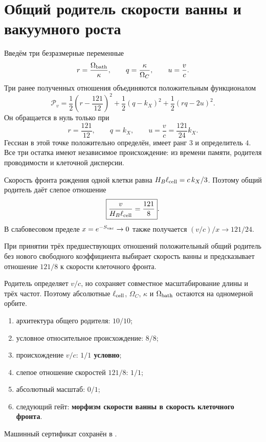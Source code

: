 \chapter{Общий родитель скорости ванны и вакуумного роста}
\label{ch:v10-bath-velocity-growth-parent}

Введём три безразмерные переменные
\begin{equation}
 r=\frac{\Omega_{\rm bath}}{\kappa},\qquad
 q=\frac{\kappa}{\Omega_C},\qquad u=\frac vc.
\end{equation}
Три ранее полученных отношения объединяются положительным функционалом
\begin{equation}
 \mathcal P_v=\frac12\left(r-\frac{121}{12}\right)^2
 +\frac12(q-k_X)^2+\frac12(rq-2u)^2.
\end{equation}
Он обращается в нуль только при
\begin{equation}
 r=\frac{121}{12},\qquad q=k_X,\qquad
 \boxed{u=\frac vc=\frac{121}{24}k_X}.
\end{equation}
Гессиан в этой точке положительно определён, имеет ранг $3$ и определитель
$4$. Все три остатка имеют независимое происхождение: из времени памяти,
родителя проводимости и клеточной дисперсии.

Скорость фронта рождения одной клетки равна
$H_B\ell_{\rm cell}=c\,k_X/3$. Поэтому общий родитель даёт слепое отношение
\begin{equation}
 \boxed{\frac{v}{H_B\ell_{\rm cell}}=\frac{121}{8}}.
\end{equation}
В слабовесовом пределе $x=e^{-S_{\rm vac}}\to0$ также получается
$(v/c)/x\to121/24$.

\begin{theorem}
При принятии трёх предшествующих отношений положительный общий родитель без
нового свободного коэффициента выбирает скорость ванны и предсказывает
отношение $121/8$ к скорости клеточного фронта.
\end{theorem}

\begin{nogocriterion}
Родитель определяет $v/c$, но сохраняет совместное масштабирование длины и
трёх частот. Поэтому абсолютные $\ell_{\rm cell}$, $\Omega_C$, $\kappa$ и
$\Omega_{\rm bath}$ остаются на одномерной орбите.
\end{nogocriterion}

\begin{protocol}\begin{enumerate}
\item архитектура общего родителя: \textbf{$10/10$};
\item условное относительное происхождение: \textbf{$8/8$};
\item происхождение $v/c$: \textbf{$1/1$ условно};
\item слепое отношение скоростей $121/8$: \textbf{$1/1$};
\item абсолютный масштаб: \textbf{$0/1$};
\item следующий гейт: \textbf{морфизм скорости ванны в скорость клеточного фронта}.
\end{enumerate}\end{protocol}

Машинный сертификат сохранён в
.